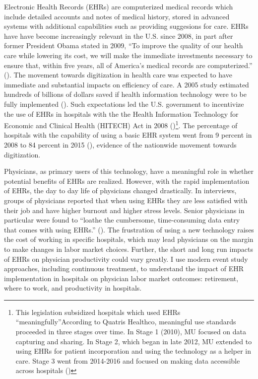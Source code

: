 \documentclass[11pt]{article}
\begin{document}
Electronic Health Records (EHRs) are computerized medical records which include detailed accounts and notes of medical history, stored in advanced systems with additional capabilities such as providing suggesions for care. EHRs have have become increasingly relevant in the U.S. since 2008, in part after former President Obama stated in 2009, “To improve the quality of our health care while lowering its cost, we will make the immediate investments necessary to ensure that, within five years, all of America’s medical records are computerized.” (\cite{presquote}). The movement towards digitization in health care was expected to have immediate and substantial impacts on efficiency of care. A 2005 study estimated hundreds of billions of dollars saved if health information technology were to be fully implemented (\cite{hillestad2005}). Such expectations led the U.S. government to incentivize the use of EHRs in hospitals with the the Health Information Technology for Economic and Clinical Health (HITECH) Act in 2008 (\cite{hitech})\footnote{This legislation subsidized hospitals which used EHRs “meaningfully”According to Quatris Healthco, meaningful use standards proceeded in three stages over time. In Stage 1 (2010), MU focused on data capturing and sharing. In Stage 2, which began in late 2012, MU extended to using EHRs for patient incorporation and using the technology as a helper in care. Stage 3 went from 2014-2016 and focused on making data accessible across hospitals (\cite{meanuse})}. The percentage of hospitals with the capability of using a basic EHR system went from 9 percent in 2008 to 84 percent in 2015 (\cite{stats}), evidence of the nationwide movement towards digitization.

Physicians, as primary users of this technology, have a meaningful role in whether potential benefits of EHRs are realized. However, with the rapid implementation of EHRs, the day to day life of physicians changed drastically. In interviews, groups of physicians reported that when using EHRs they are less satisfied with their job and have higher burnout and higher stress levels. Senior physicians in particular were found to “loathe the cumbersome, time-consuming data entry that comes with using EHRs.” (\cite{CollierBurnout}). The frustration of using a new technology raises the cost of working in specific hospitals, which may lead physicians on the margin to make changes in labor market choices. Further, the short and long run impacts of EHRs on physician productivity could vary greatly.  I use modern event study approaches, including continuous treatment, to understand the impact of EHR implementation in hospitals on physician labor market outcomes: retirement, where to work, and productivity in hospitals.
\end{document}
